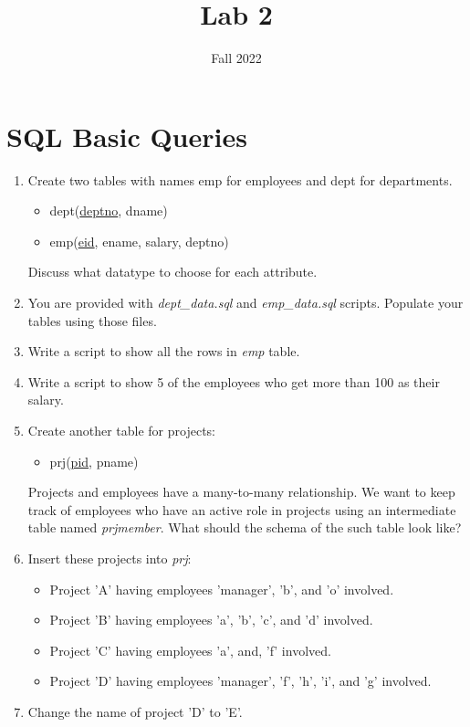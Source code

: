 \documentclass{homework}
\author{}
\date{Fall 2022}
\title{Lab 2}
\begin{document}
 \maketitle

\section{SQL Basic Queries}
\begin{enumerate}
    \item Create two tables with names emp for employees and dept for departments.
    \begin{itemize}
        \item dept(\underline{deptno}, dname)
        \item emp(\underline{eid}, ename, salary, deptno)
    \end{itemize}
Discuss what datatype to choose for each attribute.
\item You are provided with \textit{dept\_data.sql} and \textit{emp\_data.sql} scripts. Populate your tables using those files.
\item Write a script to show all the rows in \textit{emp} table.
\item Write a script to show 5 of the employees who get more than 100 as their salary.
\item Create another table for projects:
\begin{itemize}
    \item prj(\underline{pid}, pname)
\end{itemize}
Projects and employees have a many-to-many relationship. We want to keep track of employees who have an active role in projects using an intermediate table named \textit{prjmember}. What should the schema of the such table look like?
\item Insert these projects into \textit{prj}:
\begin{itemize}
    \item Project 'A' having employees 'manager', 'b', and 'o' involved.
    \item Project 'B' having employees 'a', 'b', 'c', and 'd' involved.
    \item Project 'C' having employees 'a', and, 'f' involved.
    \item Project 'D' having employees 'manager', 'f', 'h', 'i', and 'g' involved.
\end{itemize}
\item Change the name of project 'D' to 'E'.


\end{enumerate}
\end{document}
